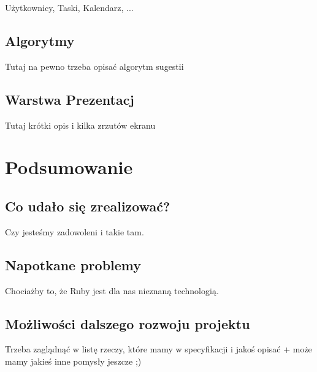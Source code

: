 \documentclass[pdflatex,11pt]{aghdpl}
\begin{document}
Użytkownicy, Taski, Kalendarz, ...

\section{Algorytmy}

Tutaj na pewno trzeba opisać algorytm sugestii

\section{Warstwa Prezentacj}

Tutaj krótki opis i kilka zrzutów ekranu


\chapter{Podsumowanie}

\section{Co udało się zrealizować?}

Czy jesteśmy zadowoleni i takie tam.

\section{Napotkane problemy}

Chociażby to, że Ruby jest dla nas nieznaną technologią.

\section{Możliwości dalszego rozwoju projektu}

Trzeba zaglądnąć w listę rzeczy, które mamy w specyfikacji i jakoś opisać + może mamy jakieś inne pomysły jeszcze ;)
\end{document}

